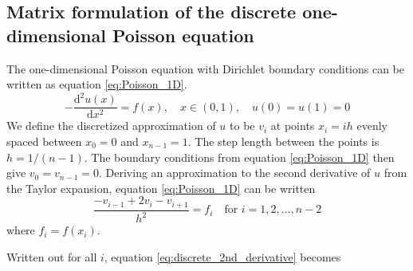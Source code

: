\documentclass[reprint, english,notitlepage]{revtex4-1}  %
\begin{document}
\subsection{Matrix formulation of the discrete one-dimensional Poisson equation}
The one-dimensional Poisson equation with Dirichlet boundary conditions can be written as equation \ref{eq:Poisson_1D}.
\begin{equation}
  \label{eq:Poisson_1D}
  - \frac{\mathrm d^2 u(x)}{\mathrm d x^2} = f(x), \quad x \in (0, 1), \quad u(0) = u(1) = 0
\end{equation}
We define the discretized approximation of $u$ to be $v_i$ at points $x_i = i h$ evenly spaced between $x_0 = 0$ and $x_{n - 1} = 1$. The step length between the points is $h = 1/(n - 1)$. The boundary conditions from equation \ref{eq:Poisson_1D} then give $v_0 = v_{n - 1} = 0$. Deriving an approximation to the second derivative of $u$ from the Taylor expansion, equation \ref{eq:Poisson_1D} can be written
\begin{equation}
  \label{eq:discrete_2nd_derivative}
  \frac{-v_{i-1} + 2 v_i - v_{i+1}}{h^2} = f_i \quad \text{for } i = 1, 2, ..., n-2
\end{equation}
where $f_i = f(x_i)$.

Written out for all $i$, equation \ref{eq:discrete_2nd_derivative} becomes
\end{document}

